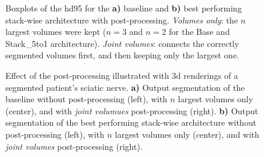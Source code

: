 \begin{figure}[htbp]
	\centering
	\hfill
	\caption[Boxplots of the \acrlong{hd95} for the post-processing]{Boxplots of the \acrlong{hd95} for the \textbf{a)} baseline and \textbf{b)} best performing stack-wise architecture with post-processing.  \textit{Volumes only}: the $n$ largest volumes were kept ($n = 3$ and $n = 2$ for the Base and Stack\_5to1 architecture). \textit{Joint volumes}: connects the correctly segmented volumes first, and then keeping only the largest one.}
	\label{fig:pp_boxplots_hd95}  
\end{figure}


\begin{figure}[htbp]
	\centering
	\hfill
	\subfloat[]
	{
		\label{fig:subfig:pp_5to1_219}
		\texttt{[image: pp\_5to1\_219]}
	}
	\caption[Segmentations Renderings]{Effect of the post-processing illustrated with \gls{3d} renderings of a segmented patient's sciatic nerve. \textbf{a)} Output segmentation of the baseline without post-processing (left), with $n$ largest volumes only (center), and with \textit{joint volumues} post-processing (right). \textbf{b)} Output segmentation of the best performing stack-wise architecture without post-processing (left), with $n$ largest volumes only (center), and with \textit{joint volumes} post-processing (right).}
	\label{fig:pp_patient_219}  
\end{figure}


